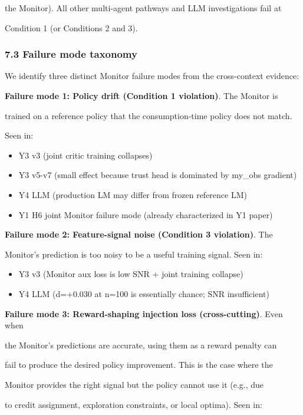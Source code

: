 \documentclass[
]{article}
\begin{document}
the Monitor). All other multi-agent pathways and LLM investigations fail
at

Condition 1 (or Conditions 2 and 3).

\subsubsection{7.3 Failure mode taxonomy}\label{failure-mode-taxonomy}

We identify three distinct Monitor failure modes from the cross-context
evidence:

\textbf{Failure mode 1: Policy drift (Condition 1 violation)}. The
Monitor is

trained on a reference policy that the consumption-time policy does not
match.

Seen in:

\begin{itemize}
\item
  Y3 v3 (joint critic training collapses)
\item
  Y3 v5-v7 (small effect because trust head is dominated by my\_obs
  gradient)
\item
  Y4 LLM (production LM may differ from frozen reference LM)
\item
  Y1 H6 joint Monitor failure mode (already characterized in Y1 paper)
\end{itemize}

\textbf{Failure mode 2: Feature-signal noise (Condition 3 violation)}.
The

Monitor's prediction is too noisy to be a useful training signal. Seen
in:

\begin{itemize}
\item
  Y3 v3 (Monitor aux loss is low SNR + joint training collapse)
\item
  Y4 LLM (d=+0.030 at n=100 is essentially chance; SNR insufficient)
\end{itemize}

\textbf{Failure mode 3: Reward-shaping injection loss (cross-cutting)}.
Even when

the Monitor's predictions are accurate, using them as a reward penalty
can

fail to produce the desired policy improvement. This is the case where
the

Monitor provides the right signal but the policy cannot use it (e.g.,
due

to credit assignment, exploration constraints, or local optima). Seen
in:
\end{document}
